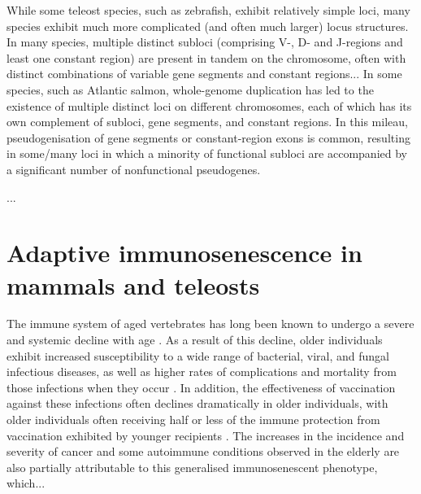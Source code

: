While some teleost species, such as zebrafish, exhibit relatively simple \igh{} loci, many species exhibit much more complicated (and often much larger) locus structures. In many species, multiple distinct subloci (comprising V-, D- and J-regions and least one constant region) are present in tandem on the chromosome, often with distinct combinations of variable gene segments and constant regions... %
In some species, such as Atlantic salmon, whole-genome duplication has led to the existence of multiple distinct \igh{} loci on different chromosomes, each of which has its own complement of subloci, gene segments, and constant regions. In this mileau, pseudogenisation of gene segments or constant-region exons is common, resulting in some/many loci in which a minority of functional subloci are accompanied by a significant number of nonfunctional pseudogenes. %

...



\section{Adaptive immunosenescence in mammals and teleosts} %


The immune system of aged vertebrates has long been known to undergo a severe and systemic decline with age \parencite{segre1977immunosenescence}. As a result of this decline, older individuals exhibit increased susceptibility to a wide range of bacterial, viral, and fungal infectious diseases, as well as higher rates of complications and mortality from those infections when they occur \parencite{sambhara2009vaccination}. In addition, the effectiveness of vaccination against these infections often declines dramatically in older individuals, with older individuals often receiving half or less of the immune protection from vaccination exhibited by younger recipients \parencite{sambhara2009vaccination}. The increases in the incidence and severity of cancer and some autoimmune conditions observed in the elderly are also partially attributable to this generalised immunosenescent phenotype, which...

